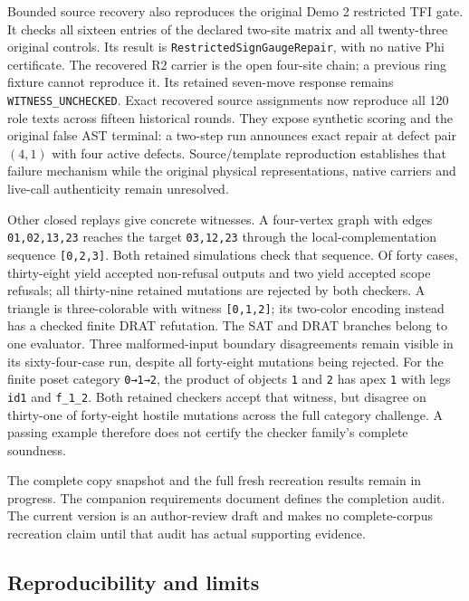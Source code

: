 \documentclass[
  11pt,
]{article}
\begin{document}
Bounded source recovery also reproduces the original Demo 2 restricted
TFI gate. It checks all sixteen entries of the declared two-site matrix
and all twenty-three original controls. Its result is
\texttt{RestrictedSignGaugeRepair}, with no native Phi certificate. The
recovered R2 carrier is the open four-site chain; a previous ring
fixture cannot reproduce it. Its retained seven-move response remains
\texttt{WITNESS\_\allowbreak{}UNCHECKED}. Exact recovered source
assignments now reproduce all 120 role texts across fifteen historical
rounds. They expose synthetic scoring and the original false AST
terminal: a two-step run announces exact repair at defect pair \((4,1)\)
with four active defects. Source/template reproduction establishes that
failure mechanism while the original physical representations, native
carriers and live-call authenticity remain unresolved.

Other closed replays give concrete witnesses. A four-vertex graph with
edges \texttt{01,02,13,23} reaches the target \texttt{03,12,23} through
the local-complementation sequence \texttt{[0,2,3]}. Both retained
simulations check that sequence. Of forty cases, thirty-eight yield
accepted non-refusal outputs and two yield accepted scope refusals; all
thirty-nine retained mutations are rejected by both checkers. A triangle
is three-colorable with witness \texttt{[0,1,2]}; its two-color encoding
instead has a checked finite DRAT refutation. The SAT and DRAT branches
belong to one evaluator. Three malformed-input boundary disagreements
remain visible in its sixty-four-case run, despite all forty-eight
mutations being rejected. For the finite poset category \texttt{0→1→2},
the product of objects \texttt{1} and \texttt{2} has apex \texttt{1}
with legs \texttt{id1} and \texttt{f\_\allowbreak{}1\_\allowbreak{}2}.
Both retained checkers accept that witness, but disagree on thirty-one
of forty-eight hostile mutations across the full category challenge. A
passing example therefore does not certify the checker family's complete
soundness.

The complete copy snapshot and the full fresh recreation results remain
in progress. The companion requirements document defines the completion
audit. The current version is an author-review draft and makes no
complete-corpus recreation claim until that audit has actual supporting
evidence.

\subsection{Reproducibility and
limits}\label{reproducibility-and-limits}
\end{document}

